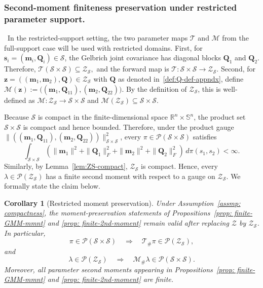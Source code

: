 \documentclass[opre,sglanonrev]{informs4}
\newtheorem{corollary}{Corollary}
\newcommand{\mT}{\mathcal{T}}
\newcommand{\mS}{\mathcal{S}}
\newcommand{\mM}{\mathcal{M}}
\newcommand{\bmean}{\bm{m}}
\newcommand{\bs}{\bm{s}}
\newcommand{\bz}{\bm{z}}
\newcommand{\bQ}{\bm Q}
\begin{document}
{\begin{APPENDICES}
\subsubsection{Second-moment finiteness preservation under restricted parameter support. }\, 
In the restricted-support setting, the two parameter maps $\mT$ and $\mM$ from the full-support case will be used with restricted domains. First, for
\(\bs_i=(\bmean_i,\bQ_i)\in\mathcal S\), the Gelbrich joint covariance
has diagonal blocks \(\bQ_1\) and \(\bQ_2\). Therefore,  $\mathcal T(\mathcal S\times\mathcal S)\subseteq\mathcal Z_{\mathcal S},$
and the forward map is $\mathcal T:\mathcal S\times\mathcal S\to\mathcal Z_{\mathcal S}$. Second, for
\(\bz=((\bmean_1,\bmean_2),\bQ)\in\mathcal Z_{\mathcal S}\)
with $\bQ$ as denoted in~\eqref{def:Q-def-appndx}, 
define $\mathcal M(\bz)
:=
\bigl((\bmean_1,\bQ_{11}),
      (\bmean_2,\bQ_{22})\bigr)$. By the definition of \(\mathcal Z_{\mathcal S}\), this is well-defined as $\mathcal M:\mathcal Z_{\mathcal S}\to\mathcal S\times\mathcal S$ and  $\mathcal M(\mathcal Z_{\mathcal S})\subseteq\mathcal S\times\mathcal S.$

Because \(\mathcal S\) is compact in the finite-dimensional space
\(\mathbb R^n\times\mathbb S^n\), the product set
\(\mathcal S\times\mathcal S\) is compact and hence bounded. Therefore, under the product gauge $\|((\bmean_1,\bQ_{11}),(\bmean_2,\bQ_{22}))\|_{\mS\times \mS}^2$, %
every
\(\pi\in\mathcal P(\mathcal S\times\mathcal S)\) satisfies
\[
\int_{\mathcal S\times\mathcal S}
\left(
\|\bmean_1\|^2+\|\bQ_1\|_F^2
+\|\bmean_2\|^2+\|\bQ_2\|_F^2
\right)
\,d\pi(s_1,s_2)<\infty.
\]
Similarly, by Lemma~\ref{lem:ZS-compact}, \(\mathcal Z_{\mathcal S}\) is
compact. Hence, every \(\lambda\in\mathcal P(\mathcal Z_{\mathcal S})\) has a finite second moment with respect to a gauge on
\(\mathcal Z_{\mathcal S}\). We formally state the claim below.

\begin{corollary}[Restricted moment preservation]
\label{cor:restricted-moment-preservation}
Under Assumption~\ref{assmp: compactness}, the moment-preservation statements
of Propositions~\ref{prop: finite-GMM-mmnt} and
\ref{prop: finite-2nd-moment} remain valid after replacing
\(\mathcal Z\) by \(\mathcal Z_{\mathcal S}\). In particular,
\[
\pi\in\mathcal P(\mathcal S\times\mathcal S)
\quad\Longrightarrow\quad
\mathcal T_{\#}\pi\in\mathcal P(\mathcal Z_{\mathcal S}),
\]
and
\[
\lambda\in\mathcal P(\mathcal Z_{\mathcal S})
\quad\Longrightarrow\quad
\mathcal M_{\#}\lambda\in\mathcal P(\mathcal S\times\mathcal S).
\]
Moreover, all parameter second moments appearing in
Propositions~\ref{prop: finite-GMM-mmnt} and
\ref{prop: finite-2nd-moment} are finite.
\end{corollary}


\end{APPENDICES}}
\end{document}
